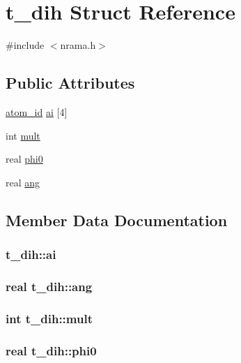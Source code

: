 \hypertarget{structt__dih}{\section{t\-\_\-dih \-Struct \-Reference}
\label{structt__dih}
}


{\ttfamily \#include $<$nrama.\-h$>$}

\subsection*{\-Public \-Attributes}
\begin{DoxyCompactItemize}
\item 
\hyperlink{include_2types_2simple_8h_ad3f47cdb48677e516e2049719612c737}{atom\-\_\-id} \hyperlink{structt__dih_ac653bd7979ae390161558c21ac03b585}{ai} \mbox{[}4\mbox{]}
\item 
int \hyperlink{structt__dih_aa301a11ad28a120da72e3ea8723c7cce}{mult}
\item 
real \hyperlink{structt__dih_a89a4df30e9845051bbf0668a547aec55}{phi0}
\item 
real \hyperlink{structt__dih_acaa9a9117feca136222e16a49c8cbf9e}{ang}
\end{DoxyCompactItemize}


\subsection{\-Member \-Data \-Documentation}
\hypertarget{structt__dih_ac653bd7979ae390161558c21ac03b585}{
\subsubsection[{ai}]{ {\bf t\-\_\-dih\-::ai}}}\label{structt__dih_ac653bd7979ae390161558c21ac03b585}
\hypertarget{structt__dih_acaa9a9117feca136222e16a49c8cbf9e}{
\subsubsection[{ang}]{\setlength{\rightskip}{0pt plus 5cm}real {\bf t\-\_\-dih\-::ang}}}\label{structt__dih_acaa9a9117feca136222e16a49c8cbf9e}
\hypertarget{structt__dih_aa301a11ad28a120da72e3ea8723c7cce}{
\subsubsection[{mult}]{\setlength{\rightskip}{0pt plus 5cm}int {\bf t\-\_\-dih\-::mult}}}\label{structt__dih_aa301a11ad28a120da72e3ea8723c7cce}
\hypertarget{structt__dih_a89a4df30e9845051bbf0668a547aec55}{
\subsubsection[{phi0}]{\setlength{\rightskip}{0pt plus 5cm}real {\bf t\-\_\-dih\-::phi0}}}\label{structt__dih_a89a4df30e9845051bbf0668a547aec55}


